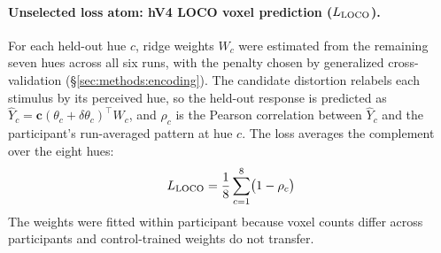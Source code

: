 


\paragraph{Unselected loss atom: hV4 LOCO voxel prediction ($L_{\rm LOCO}$).}
For each held-out hue $c$, ridge weights $W_c$ were estimated from the remaining seven hues across all six runs, with the penalty chosen by generalized cross-validation (\S\ref{sec:methods:encoding}). The candidate distortion relabels each stimulus by its perceived hue, so the held-out response is predicted as $\hat{Y}_c = \mathbf{c}(\theta_c + \delta\theta_c)^\top W_c$, and $\rho_c$ is the Pearson correlation between $\hat{Y}_c$ and the participant's run-averaged pattern at hue $c$. The loss averages the complement over the eight hues:
%
\begin{equation}
  L_{\rm LOCO} = \frac{1}{8}\sum_{c=1}^{8}\bigl(1 - \rho_c\bigr)
  \label{eq:lloco}
\end{equation}
%
The weights were fitted within participant because voxel counts differ across participants and control-trained weights do not transfer.

